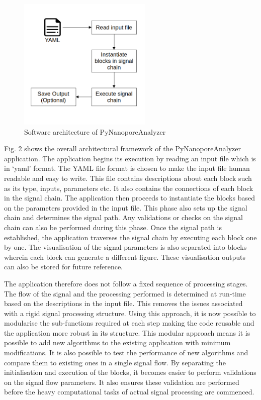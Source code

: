 \documentclass[journal]{IEEEtran}
\begin{document}
\begin{figure}[!t]
\centering
\includegraphics[width=2.5in]{SW-Arch.png}
\caption{Software architecture of PyNanoporeAnalyzer}
\label{fig_2}
\end{figure}

Fig. 2 shows the overall architectural framework of the PyNanoporeAnalyzer application. The application begins its execution by reading an input file which is in ‘yaml’ format. The YAML file format is chosen to make the input file human readable and easy to write. This file contains descriptions about each block such as its type, inputs, parameters etc. It also contains the connections of each block in the signal chain. The application then proceeds to instantiate the blocks based on the parameters provided in the input file. This phase also sets up the signal chain and determines the signal path. Any validations or checks on the signal chain can also be performed during this phase. Once the signal path is established, the application traverses the signal chain by executing each block one by one. The visualisation of the signal parameters is also separated into blocks wherein each block can generate a different figure. These visualisation outputs can also be stored for future reference.
	
The application therefore does not follow a fixed sequence of processing stages. The flow of the signal and the processing performed is determined at run-time based on the descriptions in the input file. This removes the issues associated with a rigid signal processing structure. Using this approach, it is now possible to modularise the sub-functions required at each step making the code reusable and the application more robust in its structure. This modular approach means it is possible to add new algorithms to the existing application with minimum modifications. It is also possible to test the performance of new algorithms and compare them to existing ones in a single signal flow. By separating the initialisation and execution of the blocks, it becomes easier to perform validations on the signal flow parameters. It also ensures these validation are performed before the heavy computational tasks of actual signal processing are commenced. 
\end{document}
